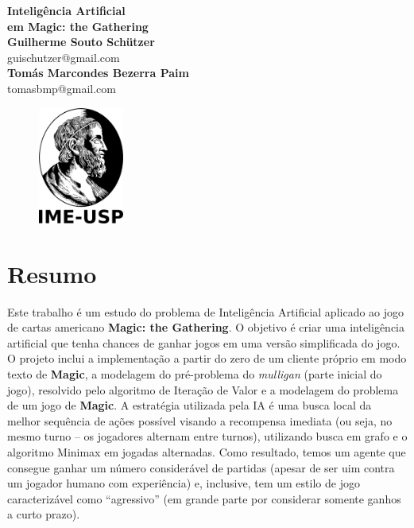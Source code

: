\documentclass[dvipsnames]{book}
\begin{document}
  \begin{titlepage}
  \begin{center}
   {\huge\bfseries Inteligência Artificial \\ em \textbf{Magic: the Gathering}\\}
   \vspace{1.5cm}
   {\bfseries Guilherme Souto Schützer}\\[5pt]
   guischutzer@gmail.com\\[14pt]
   \vspace{0.5cm}
   {\bfseries Tomás Marcondes Bezerra Paim}\\[5pt]
   tomasbmp@gmail.com\\[14pt]
   \vspace{2cm}
  {\begin{figure}[!h]
          \centering
              \includegraphics[width=0.25\textwidth]{picstcc/ime.png}
  \end{figure}}
   \vspace{0.4cm}
 \end{center}
  \end{titlepage}

\chapter*{Resumo}
Este trabalho é um estudo do problema de Inteligência Artificial aplicado ao jogo de cartas americano \textbf{Magic: the Gathering}. O objetivo é criar uma inteligência artificial que tenha chances de ganhar jogos em uma versão simplificada do jogo. O projeto inclui a implementação a partir do zero de um cliente próprio em modo texto de \textbf{Magic}, a modelagem do pré-problema do \textit{mulligan} (parte inicial do jogo), resolvido pelo algoritmo de Iteração de Valor e a modelagem do problema de um jogo de \textbf{Magic}. A estratégia utilizada pela IA é uma busca local da melhor sequência de ações possível visando a recompensa imediata (ou seja, no mesmo turno -- os jogadores alternam entre turnos), utilizando busca em grafo e o algoritmo Minimax em jogadas alternadas. Como resultado, temos um agente que consegue ganhar um número considerável de partidas (apesar de ser uim contra um jogador humano com experiência) e, inclusive, tem um estilo de jogo caracterizável como ``agressivo'' (em grande parte por considerar somente ganhos a curto prazo).
\end{document}
